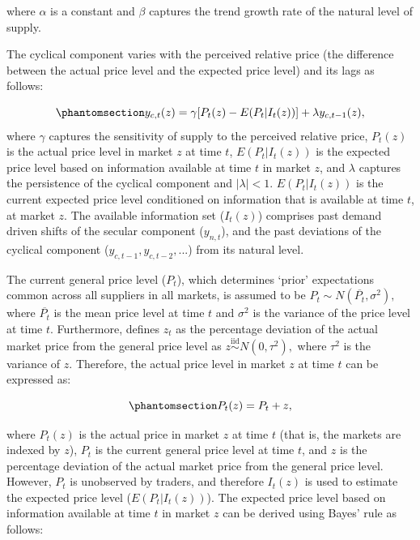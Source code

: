 \documentclass[
  letterpaper,
  DIV=11,
  numbers=noendperiod]{scrartcl}
\begin{document}
where \(\alpha\) is a constant and \(\beta\) captures the trend growth
rate of the natural level of supply.

The cyclical component varies with the perceived relative price (the
difference between the actual price level and the expected price level)
and its lags as follows:

\begin{equation}\phantomsection\label{eq-cyclical_component}{ y_{c,t}(z) = \gamma[P_t(z) - E(P_t | I_t(z))] + \lambda y_{c,t-1}(z), }\end{equation}
where \(\gamma\) captures the sensitivity of supply to the perceived
relative price, \(P_t(z)\) is the actual price level in market \(z\) at
time \(t\), \(E(P_t | I_t(z))\) is the expected price level based on
information available at time \(t\) in market \(z\), and \(\lambda\)
captures the persistence of the cyclical component and
\(|\lambda| < 1\). \(E(P_t | I_t(z))\) is the current expected price
level conditioned on information that is available at time \(t\), at
market \(z\). The available information set (\(I_t(z)\)) comprises past
demand driven shifts of the secular component (\(y_{n,t}\)), and the
past deviations of the cyclical component
(\(y_{c,t-1}, y_{c,t-2}, ...\)) from its natural level.

The current general price level (\(P_t\)), which determines `prior'
expectations common across all suppliers in all markets, is assumed to
be \(P_t \sim N(\overline{P_t}, \sigma^2),\) where \(\overline{P_t}\) is
the mean price level at time \(t\) and \(\sigma^2\) is the variance of
the price level at time \(t\). Furthermore, \citet{lucas1973} defines
\(z_t\) as the percentage deviation of the actual market price from the
general price level as \(z\overset{\text{iid}}{\sim} N(0, \tau^2),\)
where \(\tau^2\) is the variance of \(z\). Therefore, the actual price
level in market \(z\) at time \(t\) can be expressed as:

\begin{equation}\phantomsection\label{eq-price_decomposition}{P_t(z) = P_t + z, }\end{equation}

where \(P_t(z)\) is the actual price in market \(z\) at time \(t\) (that
is, the markets are indexed by \(z\)), \(P_t\) is the current general
price level at time \(t\), and \(z\) is the percentage deviation of the
actual market price from the general price level. However, \(P_t\) is
unobserved by traders, and therefore \(I_t(z)\) is used to estimate the
expected price level (\(E(P_t| I_t(z))\)). The expected price level
based on information available at time \(t\) in market \(z\) can be
derived using Bayes' rule as follows:
\end{document}
